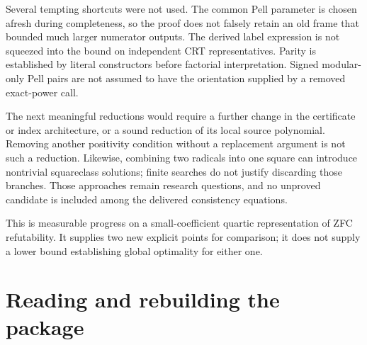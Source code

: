 \documentclass[11pt,letterpaper]{article}
\theoremstyle{remark}\newtheorem{remark}[theorem]{Remark}
\begin{document}
Several tempting shortcuts were not used. The common Pell parameter is
chosen afresh during completeness, so the proof does not falsely retain
an old frame that bounded much larger numerator outputs. The derived
label expression is not squeezed into the bound on independent CRT
representatives. Parity is established by literal constructors before
factorial interpretation. Signed modular-only Pell pairs are not assumed
to have the orientation supplied by a removed exact-power call.

The next meaningful reductions would require a further change in the
certificate or index architecture, or a sound reduction of its local
source polynomial. Removing another positivity condition without a
replacement argument is not such a reduction. Likewise, combining two
radicals into one square can introduce nontrivial squareclass solutions;
finite searches do not justify discarding those branches. Those approaches
remain research questions, and no unproved candidate is included among
the delivered consistency equations.

This is measurable progress on a small-coefficient quartic representation
of ZFC refutability. It supplies two new explicit points for comparison;
it does not supply a lower bound establishing global optimality for
either one.

\appendix
\section{Reading and rebuilding the package}
\end{document}
